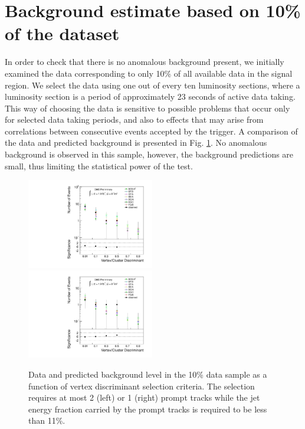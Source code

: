 \section{Background estimate based on 10\% of the dataset}
\label{sec:partunblinding}

In order to check that there is no anomalous background present,
 we initially examined the data corresponding to only 10\% of all available 
data in the signal region.  
We select the data using one out of every ten luminosity sections, where a luminosity
section is a period of approximately 23 seconds of active data taking. This way of choosing the data is sensitive to possible problems that occur only for selected data taking periods, and also to effects that may arise from
correlations between consecutive events accepted by the trigger. A comparison of the data and predicted
background is presented in Fig. \ref{fig:10percent}. No anomalous background is observed in this sample,
however, the background predictions are small, thus limiting the statistical
power of the test.

\begin{figure}[htbp]
  \centering
  \includegraphics[width=0.495\textwidth]{plots/background/tenpercent1.pdf}
  \includegraphics[width=0.495\textwidth]{plots/background/tenpercent2.pdf}
  \caption{Data and predicted background level in the 10\% data sample as a function of vertex discriminant
selection criteria. The selection requires at most 2 (left) or 1 (right) prompt tracks while the jet energy 
fraction carried by the prompt tracks is required to be less than 11\%. \label{fig:10percent}}
\end{figure}  


